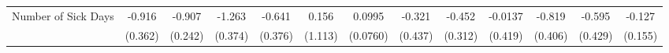 {\begin{tabular}{l*{12}{c}}
\addlinespace
Number of Sick Days&      -0.916\sym{*}  &      -0.907\sym{***}&      -1.263\sym{***}&      -0.641         &       0.156         &      0.0995         &      -0.321         &      -0.452         &     -0.0137         &      -0.819\sym{*}  &      -0.595         &      -0.127         \\
            &     (0.362)         &     (0.242)         &     (0.374)         &     (0.376)         &     (1.113)         &    (0.0760)         &     (0.437)         &     (0.312)         &     (0.419)         &     (0.406)         &     (0.429)         &     (0.155)         \\
\bottomrule
\end{tabular}
}
